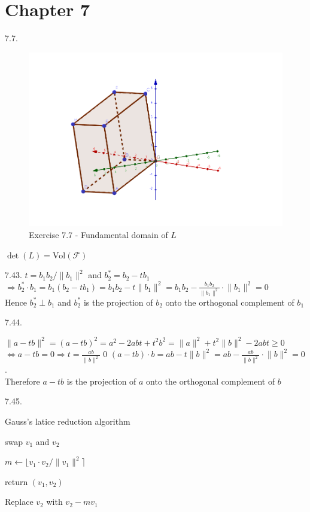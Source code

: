 \section{Chapter 7}

7.7.
	\begin{figure}[ht]
		\includegraphics[width=\textwidth]{IntroductionCryptography/exercise-7-7.png}
		\caption{Exercise 7.7 - Fundamental domain of $L$}
	\end{figure}
	$\det (L) = \text{Vol} (\mathcal{F})$


7.43. $t = b_1 b_2 / \lVert b_1 \rVert^2$ and $b_2^* = b_2 - tb_1$ \\ $\Rightarrow b_2^* \cdot b_1 = b_1 (b_2 - tb_1) = b_1 b_2 - t \lVert b_1 \rVert^2 = b_1 b_2 - \frac{b_1 b_2}{\lVert b_1 \rVert^2} \cdot \lVert b_1 \rVert^2 = 0$ \\ Hence $b_2^* \perp b_1$ and $b_2^*$ is the projection of $b_2$ onto the orthogonal complement of $b_1$


7.44.
	
		 $\lVert a - tb \rVert^2 = (a - tb)^2 = a^2 - 2abt + t^2b^2 = \lVert a\rVert^2 + t^2 \lVert b\rVert^2 - 2abt \geq 0$ \\ $\Leftrightarrow a - tb = 0 \Rightarrow t = \frac{ab}{\lVert b \rVert^2}$
		 0
		 $(a - tb)\cdot b = ab - t \lVert b \rVert^2 = ab - \frac{ab}{\lVert b \rVert^2} \cdot \lVert b \rVert^2 = 0$. \\ Therefore $a - tb$ is the projection of $a$ onto the orthogonal complement of $b$
	
7.45.
	\begin{algorithm}[ht]
		\caption{Gauss's latice reduction algorithm}
		\begin{algorithmic}

				swap $v_1$ and $v_2$	
			
				$m \gets \lfloor v_1 \cdot v_2 / \lVert v_1 \rVert^2 \rceil$
			\EndIf

				return $(v_1, v_2)$
			\EndIf

			Replace $v_2$ with $v_2 - mv_1$
			\EndWhile
		\end{algorithmic}
	
	\end{algorithm}
	
